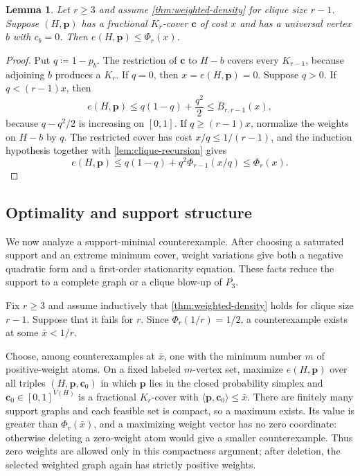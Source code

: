 \documentclass[10pt]{article}
\numberwithin{equation}{section}
\newtheorem{lemma}[lemma]{Lemma}
\newcommand{\vct}[1]{\boldsymbol{#1}}
\begin{document}
\begin{lemma}\label{lem:universal-zero-peeling}
Let $r\ge3$ and assume \cref{thm:weighted-density} for clique size $r-1$.  Suppose $(H,\vct p)$ has a fractional $K_r$-cover $\vct c$ of cost $x$ and has a universal vertex $b$ with $c_b=0$.  Then $e(H,\vct p)\le \Phi_r(x)$.
\end{lemma}

\begin{proof}
Put $q\coloneqq1-p_b$.  The restriction of $\vct c$ to $H-b$ covers every $K_{r-1}$, because adjoining $b$ produces a $K_r$.  If $q=0$, then $x=e(H,\vct p)=0$.  Suppose $q>0$.  If $q<(r-1)x$, then
\[
 e(H,\vct p)\le q(1-q)+\frac{q^2}{2}\le B_{r,r-1}(x),
\]
because $q-q^2/2$ is increasing on $[0,1]$.  If $q\ge(r-1)x$, normalize the weights on $H-b$ by $q$.  The restricted cover has cost $x/q\le1/(r-1)$, and the induction hypothesis together with \cref{lem:clique-recursion} gives
\[
 e(H,\vct p)\le q(1-q)+q^2\Phi_{r-1}(x/q)\le \Phi_r(x).
\]
\end{proof}

\subsection{Optimality and support structure}\label{sec:weighted-counterexample}

We now analyze a support-minimal counterexample.  After choosing a saturated support and an extreme minimum cover, weight variations give both a negative quadratic form and a first-order stationarity equation.  These facts reduce the support to a complete graph or a clique blow-up of $P_3$.

Fix $r\ge3$ and assume inductively that \cref{thm:weighted-density} holds for clique size $r-1$.  Suppose that it fails for $r$.  Since $\Phi_r(1/r)=1/2$, a counterexample exists at some $\bar x<1/r$.

Choose, among counterexamples at $\bar x$, one with the minimum number $m$ of positive-weight atoms.  On a fixed labeled $m$-vertex set, maximize $e(H,\vct p)$ over all triples $(H,\vct p,\vct c_0)$ in which $\vct p$ lies in the closed probability simplex and $\vct c_0\in[0,1]^{V(H)}$ is a fractional $K_r$-cover with $\langle\vct p,\vct c_0\rangle\le\bar x$.  There are finitely many support graphs and each feasible set is compact, so a maximum exists.  Its value is greater than $\Phi_r(\bar x)$, and a maximizing weight vector has no zero coordinate: otherwise deleting a zero-weight atom would give a smaller counterexample.  Thus zero weights are allowed only in this compactness argument; after deletion, the selected weighted graph again has strictly positive weights.
\end{document}
